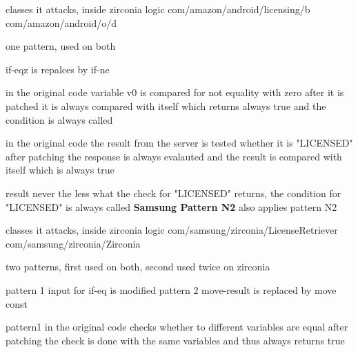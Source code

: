 classes it attacks, inside zirconia logic
com/amazon/android/licensing/b
com/amazon/android/o/d

one pattern, used on both



if-eqz is repalces by if-ne


in the original code variable v0 is compared for not equality with zero
after it is patched it is always compared with itself which returns always true and the condition is always called



in the original code the result from the server is tested whether it is "LICENSED"
after patching the response is always evalauted and the result is compared with itself which is always true

result
never the less what the check for "LICENSED" returns, the condition for "LICENSED" is always called
\newline
\newline
\textbf{Samsung Pattern N2}\newline
also applies pattern N2

classes it attacks, inside zirconia logic
com/samsung/zirconia/LicenseRetriever
com/samsung/zirconia/Zirconia

two patterns, first used on both, second used twice on zirconia



pattern 1
input for if-eq is modified
pattern 2
move-result is replaced by move const


pattern1
in the original code checks whether to different variables are equal
after patching the check is done with the same variables and thus always returns true

